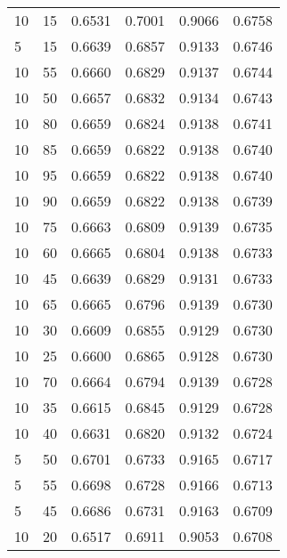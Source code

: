 \begin{center}
\begin{longtable}{|l|l|l|l|l|l|}
10                & 15                & 0.6531    & 0.7001 & 0.9066      & 0.6758    \\
5                 & 15                & 0.6639    & 0.6857 & 0.9133      & 0.6746    \\
10                & 55                & 0.6660    & 0.6829 & 0.9137      & 0.6744    \\
10                & 50                & 0.6657    & 0.6832 & 0.9134      & 0.6743    \\
10                & 80                & 0.6659    & 0.6824 & 0.9138      & 0.6741    \\
10                & 85                & 0.6659    & 0.6822 & 0.9138      & 0.6740    \\
10                & 95                & 0.6659    & 0.6822 & 0.9138      & 0.6740    \\
10                & 90                & 0.6659    & 0.6822 & 0.9138      & 0.6739    \\
10                & 75                & 0.6663    & 0.6809 & 0.9139      & 0.6735    \\
10                & 60                & 0.6665    & 0.6804 & 0.9138      & 0.6733    \\
10                & 45                & 0.6639    & 0.6829 & 0.9131      & 0.6733    \\
10                & 65                & 0.6665    & 0.6796 & 0.9139      & 0.6730    \\
10                & 30                & 0.6609    & 0.6855 & 0.9129      & 0.6730    \\
10                & 25                & 0.6600    & 0.6865 & 0.9128      & 0.6730    \\
10                & 70                & 0.6664    & 0.6794 & 0.9139      & 0.6728    \\
10                & 35                & 0.6615    & 0.6845 & 0.9129      & 0.6728    \\
10                & 40                & 0.6631    & 0.6820 & 0.9132      & 0.6724    \\
5                 & 50                & 0.6701    & 0.6733 & 0.9165      & 0.6717    \\
5                 & 55                & 0.6698    & 0.6728 & 0.9166      & 0.6713    \\
5                 & 45                & 0.6686    & 0.6731 & 0.9163      & 0.6709    \\
10                & 20                & 0.6517    & 0.6911 & 0.9053      & 0.6708    \\

\end{longtable}
\end{center}
